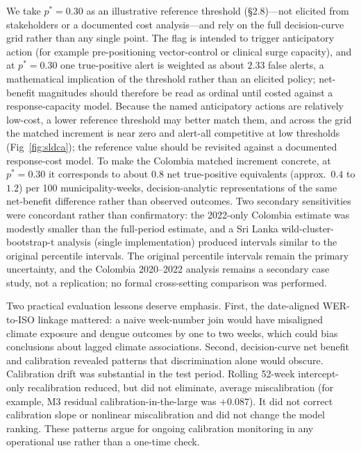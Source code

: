 \documentclass[11pt,a4paper]{article}
\begin{document}
We take $p^*=0.30$ as an illustrative reference threshold (\S2.8)---not elicited from stakeholders or a documented cost analysis---and rely on the full decision-curve grid rather than any single point. The flag is intended to trigger anticipatory action (for example pre-positioning vector-control or clinical surge capacity), and at $p^*=0.30$ one true-positive alert is weighted as about $2.33$ false alerts, a mathematical implication of the threshold rather than an elicited policy; net-benefit magnitudes should therefore be read as ordinal until costed against a response-capacity model. Because the named anticipatory actions are relatively low-cost, a lower reference threshold may better match them, and across the grid the matched increment is near zero and alert-all competitive at low thresholds (Fig~\ref{fig:sldca}); the reference value should be revisited against a documented response-cost model. To make the Colombia matched increment concrete, at $p^*=0.30$ it corresponds to about $0.8$ net true-positive equivalents (approx.\ $0.4$ to $1.2$) per 100 municipality-weeks, decision-analytic representations of the same net-benefit difference rather than observed outcomes. Two secondary sensitivities were concordant rather than confirmatory: the 2022-only Colombia estimate was modestly smaller than the full-period estimate, and a Sri Lanka wild-cluster-bootstrap-t analysis (single implementation) produced intervals similar to the original percentile intervals. The original percentile intervals remain the primary uncertainty, and the Colombia 2020--2022 analysis remains a secondary case study, not a replication; no formal cross-setting comparison was performed.

Two practical evaluation lessons deserve emphasis. First, the date-aligned WER-to-ISO linkage mattered: a naive week-number join would have misaligned climate exposure and dengue outcomes by one to two weeks, which could bias conclusions about lagged climate associations. Second, decision-curve net benefit and calibration revealed patterns that discrimination alone would obscure. Calibration drift was substantial in the test period. Rolling 52-week intercept-only recalibration reduced, but did not eliminate, average miscalibration (for example, M3 residual calibration-in-the-large was $+0.087$). It did not correct calibration slope or nonlinear miscalibration and did not change the model ranking. These patterns argue for ongoing calibration monitoring in any operational use rather than a one-time check.
\end{document}
